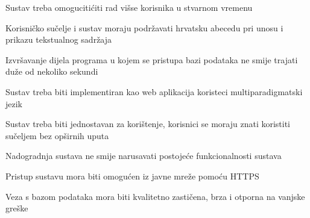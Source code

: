 			 \begin{packed_item}
	
			\item Sustav treba omogucitićiti rad višse korisnika u stvarnom vremenu
			\item  Korisničko sučelje i sustav moraju podržavati hrvatsku abecedu pri unosu i prikazu tekstualnog sadržaja 
			\item  Izvršavanje dijela programa u kojem se pristupa bazi podataka ne smije trajati duže od nekoliko sekundi
			\item  Sustav treba biti implementiran kao web aplikacija koristeci multiparadigmatski jezik
			\item  Sustav treba biti jednostavan za korištenje, korisnici se moraju znati koristiti sučeljem bez opširnih uputa 
			\item  Nadogradnja sustava ne smije narusavati postojeće funkcionalnosti sustava
			\item Pristup sustavu mora biti omogućen iz javne mreže pomoću HTTPS
			\item Veza s bazom podataka mora biti kvalitetno zastičena, brza i otporna na vanjske greške 
						

			\end{packed_item}
			 
			 
			 
	